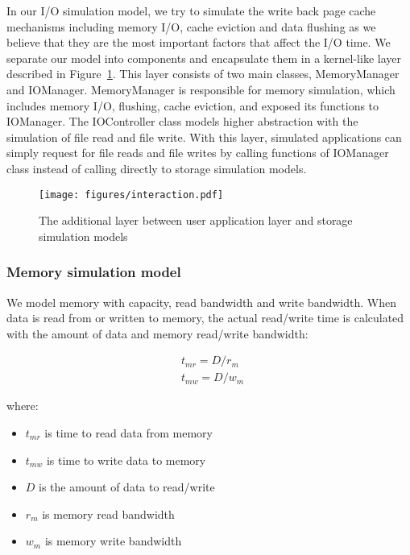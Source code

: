\documentclass[conference]{IEEEtran}
\begin{document}
			In our I/O simulation model, we try to simulate the write back page cache 
			mechanisms including memory I/O, cache eviction and data flushing as we 
			believe that they are the most important factors that affect the I/O time. 
			We separate our model into components and encapsulate them in a 
			kernel-like layer described in Figure~\ref{fig:interaction}. 
			This layer consists of two main classes, MemoryManager and IOManager.
			MemoryManager is responsible for memory simulation, which includes 
			memory I/O, flushing, cache eviction, and exposed its functions 
			to IOManager. The IOController class models higher abstraction with the 
			simulation of file read and file write.
			With this layer, simulated applications can simply request for 
			file reads and file writes by calling functions of IOManager class 
			instead of calling directly to storage simulation models.

			\begin{figure}
   				\centering
   				\texttt{[image: figures/interaction.pdf]}
   				\caption{The additional layer between user application layer and 
   				storage simulation models}\label{fig:interaction}
			\end{figure}	

			\subsubsection{Memory simulation model}

			We model memory with capacity, read bandwidth and write bandwidth. 
			When data is read from or written to memory, the actual 
			read/write time is calculated with the amount of data and memory 
			read/write bandwidth:
			
			\begin{align*}
				& t_{mr} = D / r_m \\ 
				& t_{mw} = D / w_m\
			\end{align*}		
			
			where:
			\begin{itemize}
				\item $t_{mr}$ is time to read data from memory
				\item $t_{mw}$ is time to write data to memory
				\item $D$ is the amount of data to read/write
				\item $r_m$ is memory read bandwidth
				\item $w_m$ is memory write bandwidth
			\end{itemize}						
			
\end{document}
